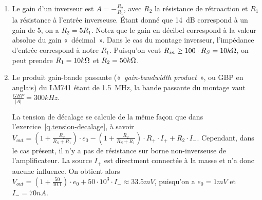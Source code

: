 \documentclass{template/tp}
\begin{document}
{
	\begin{enumerate}
		\item Le gain d'un inverseur est $A = -\frac{R_2}{R_1}$, avec $R_2$ la résistance de rétroaction et $R_1$ la résistance à l'entrée inverseuse.
		Étant donné que 14~dB correspond à un gain de 5, on a $R_2 = 5 R_1$. Notez que le gain en décibel correspond à la valeur absolue du gain «~décimal~».
		Dans le cas du montage inverseur, l'impédance d'entrée correspond à notre $R_1$.
		Puisqu'on veut $R_{in} \geq 100 \cdot R_S = 10k\ohm$, on peut prendre $R_1 = 10 k\ohm$ et $R_2 = 50 k\ohm$.

		\item Le produit gain-bande passante («~\textit{gain-bandwidth product}~», ou GBP en anglais) du LM741 étant de 1.5~MHz, la bande passante du montage vaut $\frac{GBP}{|A|} = 300 kHz$.

		La tension de décalage se calcule de la même façon que dans l'exercice~\ref{q.tension-decalage}, à savoir $V_{out} = (1+\frac{R_2}{R_S+R_1})\cdot e_0 - (1+\frac{R_2}{R_S+R_1}) \cdot R_+ \cdot I_+ + R_2 \cdot I_-$.
		Cependant, dans le cas présent, il n'y a pas de résistance sur borne non-inverseuse de l'amplificateur. 
		La source $I_+$ est directment connectée à la masse et n'a donc aucune influence.
		On obtient alors $V_{out} =  (1+\frac{50}{10.1}) \cdot e_0 + 50 \cdot 10^3 \cdot I_- \approx 33.5 mV$, puisqu'on a $e_0 = 1mV$ et $I_- = 70nA$.
	\end{enumerate}
}
\end{document}

